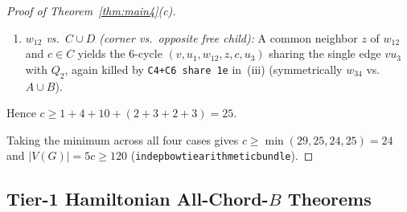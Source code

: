 \documentclass[11pt,reqno]{amsart}
\theoremstyle{plain}
\theoremstyle{definition}
\theoremstyle{remark}
\DeclareRobustCommand{\_}{\ifmmode\text{\textunderscore}\else\textunderscore\allowbreak\fi}
\begin{document}
\begin{proof}[Proof of Theorem~\ref{thm:main4}(c)]
\begin{itemize}[leftmargin=1.6em]
\begin{itemize}[leftmargin=1.4em]
\begin{enumerate}[label=(\alph*),leftmargin=1.6em]
      \item \emph{$w_{12}$ vs.\ $C \cup D$ (corner vs.\ opposite free child):} A common neighbor $z$ of $w_{12}$ and $c \in C$ yields the $6$-cycle $(v, u_1, w_{12}, z, c, u_3)$ sharing the single edge $v u_3$ with $Q_2$, again killed by \texttt{C4+C6 share 1e} in~(iii) (symmetrically $w_{34}$ vs.\ $A \cup B$).
    \end{enumerate}
    Hence $c \ge 1 + 4 + 10 + (2 + 3 + 2 + 3) = 25$.
  \end{itemize}
\end{itemize}
Taking the minimum across all four cases gives $c \ge \min(29, 25, 24, 25) = 24$ and $|V(G)| = 5c \ge 120$ (\texttt{indep\_bowtie\_120\_arithmetic\_bundle}).
\end{proof}

\subsection{Tier-1 Hamiltonian All-Chord-\texorpdfstring{$B$}{B} Theorems}\label{subsec:ham}
\end{document}
